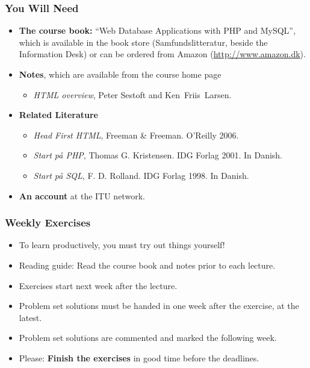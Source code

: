 \documentclass[dvipsnames]{beamer}
\begin{document}
\begin{frame}
\frametitle{You Will Need}

\begin{itemize}
\item \textbf{The course book:} ``Web Database Applications with PHP
  and MySQL'', which is available in the book store
  (Samfundslitteratur, beside the Information Desk) or can be ordered
  from Amazon (\url{http://www.amazon.dk}).
\item \textbf{Notes}, which are available from the course home page
  \begin{itemize}
 \item \emph{HTML overview}, Peter Sestoft and Ken~Friis~Larsen.
 \end{itemize}
\item \textbf{Related Literature}
  \begin{itemize}
  \item \textit{Head First HTML}, Freeman \& Freeman. O'Reilly 2006.
  \item \emph{Start på PHP}, Thomas G. Kristensen. IDG Forlag 2001. In Danish.
  \item \emph{Start på SQL}, F. D. Rolland. IDG Forlag 1998. In Danish.
\end{itemize}
\item \textbf{An account} at the ITU network.
\end{itemize}
\end{frame}

\begin{frame}
\frametitle{Weekly Exercises}

\begin{itemize}
\item To learn productively, you must try out things yourself!
\item Reading guide: Read the course book and notes prior to each lecture.
\item Exercises start next week after the lecture.
\item Problem set solutions must be handed in one week after the
  exercise, at the latest.
\item Problem set solutions are commented and marked the following week.
\item Please: \textbf{Finish the exercises} in good time before the deadlines.
\end{itemize}
\end{frame}
\end{document}
